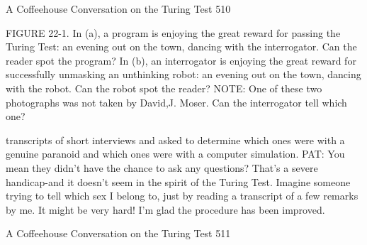 A Coffeehouse Conversation on the Turing Test                                        510

FIGURE 22-1. In (a), a program is enjoying the great reward for passing the Turing
   Test: an evening out on the town, dancing with the interrogator. Can the reader
   spot the program? In (b), an interrogator is enjoying the great reward for
   successfully unmasking an unthinking robot: an evening out on the town, dancing
   with the robot. Can the robot spot the reader? NOTE: One of these two
   photographs was not taken by David,J. Moser. Can the interrogator tell which
   one?

   transcripts of short interviews and asked to determine which ones were with a
   genuine paranoid and which ones were with a computer simulation.
PAT: You mean they didn't have the chance to ask any questions? That's a severe
   handicap-and it doesn't seem in the spirit of the Turing Test. Imagine someone
   trying to tell which sex I belong to, just by reading a transcript of a few remarks
   by me. It might be very hard! I'm glad the procedure has been improved.




A Coffeehouse Conversation on the Turing Test                                     511

